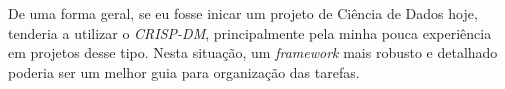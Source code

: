 \documentclass[
	article,			%
	11pt,				%
	oneside,			%
	a4paper,			%
	english,			%
	brazil,				%
	sumario=tradicional
	]{abntex2}
\begin{document}
De uma forma geral, se eu fosse inicar um projeto de Ciência de Dados hoje,
tenderia a utilizar o \textit{CRISP-DM}, principalmente pela minha pouca
experiência em projetos desse tipo. Nesta situação, um \textit{framework} mais
robusto e detalhado poderia ser um melhor guia para organização das tarefas.

\postextual


\end{document}

